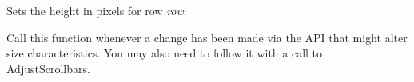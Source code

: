 \label{wxgridsetrowheight}


Sets the height in pixels for row {\it row}.

\label{wxgridupdatedimensions}


Call this function whenever a change has been made via the API that
might alter size characteristics. You may also need to follow it with
a call to AdjustScrollbars.


